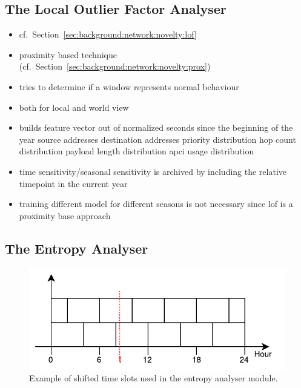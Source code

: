 \subsection{The Local Outlier Factor Analyser}
\label{sec:concept:anal:lof}

\begin{itemize}
	\item cf.~Section~\ref{sec:background:network:novelty:lof}
	\item proximity based technique (cf.~Section~\ref{sec:background:network:novelty:prox})
	\item tries to determine if a window represents normal behaviour
	\item both for local and world view
	\item builds feature vector out of
		\subitem normalized seconds since the beginning of the year
		\subitem source addresses
		\subitem destination addresses
		\subitem priority distribution
		\subitem hop count distribution
		\subitem payload length distribution
		\subitem \gls{apci} usage distribution
	\item time sensitivity/seasonal sensitivity is archived by including the relative timepoint in the current year
	\item training different model for different seasons is not necessary since \gls{lof} is a proximity base approach
\end{itemize}

\subsection{The Entropy Analyser}
\label{sec:concept:anal:entropy}

\begin{figure}[h]
	\centering
	\includegraphics[]{figures/300-time-slots.pdf}
	\caption{Example of shifted time slots used in the entropy analyser module.}
	\label{fig:concept:time-slots}
\end{figure}

